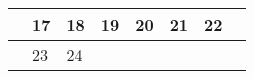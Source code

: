 {\begin{tabularx}{\linewidth}{|l!{\vrule width \myLenLineThicknessThick}*{7}{@{}X@{}|}}
       & 
    
      
      
        \begin{minipage}[t]{6mm}\centering{}17\end{minipage}
      
       & 
    
      
      
        \begin{minipage}[t]{6mm}\centering{}18\end{minipage}
      
       & 
    
      
      
        \begin{minipage}[t]{6mm}\centering{}19\end{minipage}
      
       & 
    
      
      
        \begin{minipage}[t]{6mm}\centering{}20\end{minipage}
      
       & 
    
      
      
        \begin{minipage}[t]{6mm}\centering{}21\end{minipage}
      
       & 
    
      
      
        \begin{minipage}[t]{6mm}\centering{}22\end{minipage}
      
      
        \\  \hline 
      
    
  
  
  
  \hyperlink{week-2026-8}{} &
    
      
      
        \begin{minipage}[t]{6mm}\centering{}23\end{minipage}
      
       & 
    
      
      
        \begin{minipage}[t]{6mm}\centering{}24\end{minipage}
      

\end{tabularx}}
